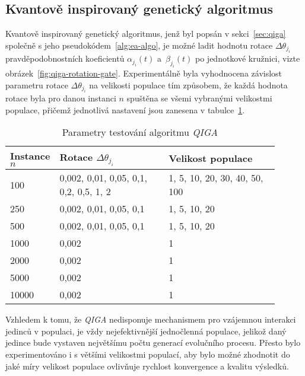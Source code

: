 \subsection*{Kvantově inspirovaný genetický algoritmus}
Kvantově inspirovaný genetický algoritmus, jenž byl popsán v sekci~\ref{sec:qiga} společně s jeho pseudokódem~\ref{alg:ea-algo}, je možné ladit hodnotu rotace $\Delta\theta_{j_i}$ pravděpodobnostních koeficientů $\alpha_{j_i}\left(t\right)$ a~$\beta_{j_i}\left(t\right)$ po jednotkové kružnici, vizte obrázek~\ref{fig:qiga-rotation-gate}.
Experimentálně byla vyhodnocena závislost parametru rotace $\Delta\theta_{j_i}$ na velikosti populace tím způsobem, že každá hodnota rotace byla pro danou instanci $n$ spuštěna se všemi vybranými velikostmi populace, přičemž jednotlivá nastavení jsou zanesena v tabulce~\ref{tab:qiga-all-instance}.
\begin{table}[ht]
    \centering
    \label{tab:qiga-all-instance}
    \begin{tabularx}{\linewidth}{@{} 
        l 
        p{0.45\linewidth} 
        p{0.45\linewidth} 
      @{}}
      \toprule
      \textbf{Instance $n$} & \textbf{Rotace $\Delta\theta_{j_i}$} & \textbf{Velikost populace} \\
      \midrule
      100  
        & 0,002, 0,01, 0,05, 0,1, 0,2, 0,5, 1, 2
        & 1, 5, 10, 20, 30, 40, 50, 100 \\[1ex]
      250  
        & 0,002, 0,01, 0,05, 0,1
        & 1, 5, 10, 20 \\[1ex]
      500  
        & 0,002, 0,01, 0,05, 0,1
        & 1, 5, 10, 20 \\[1ex]
      1000 
        & 0,002
        & 1 \\[1ex]
      2000 
        & 0,002
        & 1 \\[1ex]
      5000 
        & 0,002
        & 1 \\[1ex]
      10000 
        & 0,002
        & 1 \\
      \bottomrule
    \end{tabularx}
    \caption{Parametry testování algoritmu \emph{QIGA}}
\end{table}
Vzhledem k tomu, že \emph{QIGA} nedisponuje mechanismem pro vzájemnou interakci jedinců v populaci, je vždy nejefektivnější jednočlenná populace, jelikož daný jedince bude vystaven největšímu počtu generací evolučního procesu. 
Přesto bylo experimentováno i s většími velikostmi populací, aby bylo možné zhodnotit do jaké míry velikost populace ovlivňuje rychlost konvergence a kvalitu výsledků.

